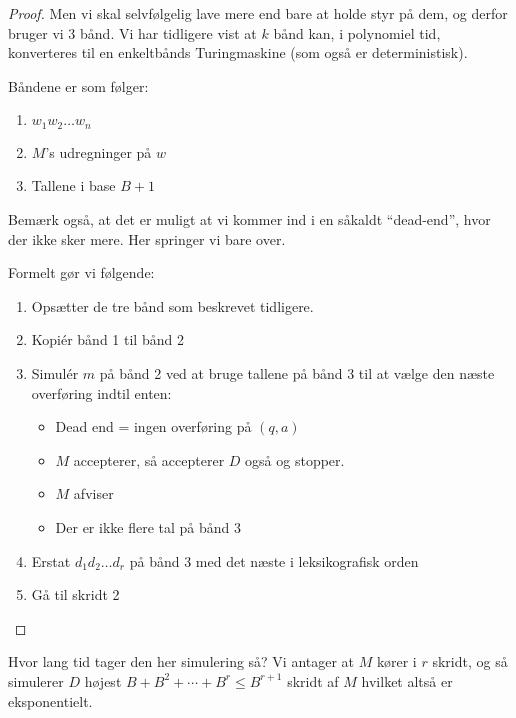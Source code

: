 \begin{proof}
	Men vi skal selvfølgelig lave mere end bare at holde styr på dem, og derfor bruger vi 3 bånd. Vi har tidligere vist at $k$ bånd kan, i polynomiel tid, konverteres til en enkeltbånds Turingmaskine (som også er deterministisk).

	Båndene er som følger:
	\begin{enumerate}
		\item $w_{1}w_{2} \ldots w_{n}$
		\item $M$'s udregninger på $w$
		\item Tallene i base $B+1$
	\end{enumerate}

	Bemærk også, at det er muligt at vi kommer ind i en såkaldt ``dead-end'', hvor der ikke sker mere. Her springer vi bare over.

	Formelt gør vi følgende:
	\begin{enumerate}
		\item Opsætter de tre bånd som beskrevet tidligere.
		\item Kopiér bånd 1 til bånd 2
		\item Simulér $m$ på bånd 2 ved at bruge tallene på bånd 3 til at vælge den næste overføring indtil enten:
		      \begin{itemize}
			      \item Dead end = ingen overføring på $(q,a)$
			      \item $M$ accepterer, så accepterer $D$ også og stopper.
			      \item $M$ afviser
			      \item Der er ikke flere tal på bånd 3
		      \end{itemize}
		\item Erstat $d_{1}d_{2} \ldots d_{r}$ på bånd 3 med det næste i leksikografisk orden
		\item Gå til skridt 2
	\end{enumerate}
\end{proof}

Hvor lang tid tager den her simulering så? Vi antager at $M$ kører i $r$ skridt, og så simulerer $D$ højest $B + B^{2} + \cdots + B^{r} \le B^{r+1}$ skridt af $M$ hvilket altså er eksponentielt.


